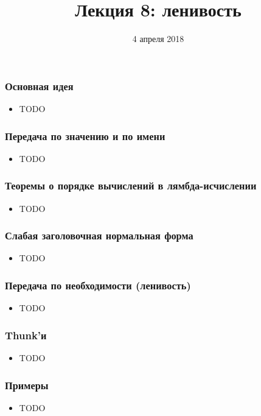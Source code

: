 \documentclass[11pt]{beamer}
\title{Лекция 8: ленивость}
\date{4 апреля 2018}
\begin{document}
\begin{frame}[plain]
\maketitle
\end{frame}

\begin{frame}[fragile]
\frametitle{Основная идея}
\begin{itemize}
    \item TODO
\end{itemize}
\end{frame}

\begin{frame}[fragile]
\frametitle{Передача по значению и по имени}
\begin{itemize}
\item TODO
\end{itemize}
\end{frame}

\begin{frame}[fragile]
\frametitle{Теоремы о порядке вычислений в лямбда-исчислении}
\begin{itemize}
\item TODO
\end{itemize}
\end{frame}

\begin{frame}[fragile]
\frametitle{Слабая заголовочная нормальная форма}
\begin{itemize}
\item TODO
\end{itemize}
\end{frame}

\begin{frame}[fragile]
\frametitle{Передача по необходимости (ленивость)}
\begin{itemize}
\item TODO
\end{itemize}
\end{frame}

\begin{frame}[fragile]
\frametitle{Thunk'и}
\begin{itemize}
\item TODO
\end{itemize}
\end{frame}

\begin{frame}[fragile]
\frametitle{Примеры}
\begin{itemize}
\item TODO
\end{itemize}
\end{frame}
\end{document}
